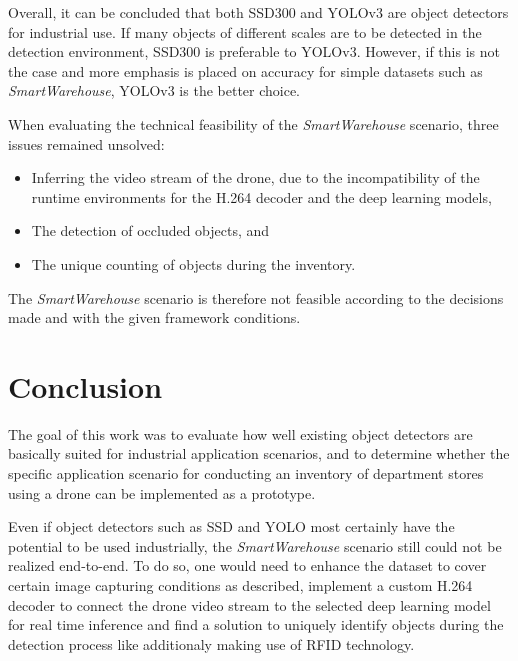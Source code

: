 \documentclass[a4paper, 10pt, journal]{wissarbIEEE}      %
\begin{document}
Overall, it can be concluded that both SSD300 and YOLOv3 are object detectors for industrial use. If many objects of different scales are to be detected in the detection environment, SSD300 is preferable to YOLOv3. However, if this is not the case and more emphasis is placed on accuracy for simple datasets such as \textit{SmartWarehouse}, YOLOv3 is the better choice.

When evaluating the technical feasibility of the \textit{SmartWarehouse} scenario, three issues remained unsolved:

\begin{itemize}
	\item Inferring the video stream of the drone, due to the incompatibility of the runtime environments for the H.264 decoder and the deep learning models,
	\item The detection of occluded objects, and
	\item The unique counting of objects during the inventory.
\end{itemize}

The \textit{SmartWarehouse} scenario is therefore not feasible according to the decisions made and with the given framework conditions.

\section{Conclusion} \label{conclusion}

The goal of this work was to evaluate how well existing object detectors are basically suited for industrial application scenarios, and to determine whether the specific application scenario for conducting an inventory of department stores using a drone can be implemented as a prototype. 

Even if object detectors such as SSD and YOLO most certainly have the potential to be used industrially, the \textit{SmartWarehouse} scenario still could not be realized end-to-end. To do so, one would need to enhance the dataset to cover certain image capturing conditions as described, implement a custom H.264 decoder to connect the drone video stream to the selected deep learning model for real time inference and find a solution to uniquely identify objects during the detection process like additionaly making use of RFID technology. 


\end{document}
